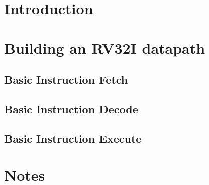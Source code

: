 \documentclass[a4paper]{book}
\begin{document}
\frontmatter
\maketitle
\tableofcontents
\let\cleardoublepage\clearpage
\mainmatter
\chapter{Introduction}


\chapter{Building an RV32I datapath}
\section{Basic Instruction Fetch}


\section{Basic Instruction Decode}


\section{Basic Instruction Execute}

\let\cleardoublepage\clearpage

\chapter{Notes}

 

\end{document}
